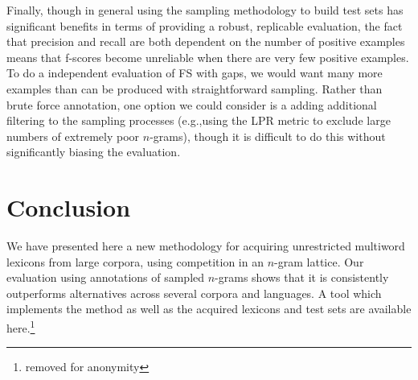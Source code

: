 \documentclass[11pt,letterpaper]{article}
\makeatletter
\def \eg {e.g.,\@ }
\makeatother
\begin{document}
Finally, though in general using the sampling methodology to build test sets has significant benefits in terms of providing a robust, replicable evaluation, the fact that precision and recall are both dependent on the number of positive examples means that f-scores become unreliable when there are very few positive examples. To do a independent evaluation of FS with gaps, we would want many more examples than can be produced with straightforward sampling. Rather than brute force annotation, one option we could consider is a adding additional filtering to the sampling processes (\eg using the LPR metric to exclude large numbers of extremely poor $n$-grams), though it is difficult to do this without significantly biasing the evaluation.

\section{Conclusion}

We have presented here a new methodology for acquiring unrestricted multiword lexicons from large corpora, using competition in an $n$-gram lattice. Our evaluation using annotations of sampled $n$-grams shows that it is consistently outperforms alternatives across several corpora and languages. A tool which implements the method as well as the acquired lexicons and test sets are available here.\footnote{removed for anonymity} 








\end{document}
